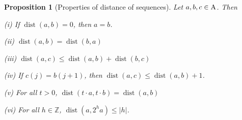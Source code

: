 \documentclass[12pt,reqno]{amsart}
\theoremstyle{plain}
\newtheorem{proposition}[theorem]{Proposition}
\numberwithin{equation}{section}
\theoremstyle{remark}
\newcommand{\uses}[1]{}
\newcommand{\usesdefs}[1]{}
\DeclareMathOperator{\dist}{dist}
\begin{document}
\begin{proposition}[Properties of distance of sequences]\label{Properties of distance of sequences}\uses{}\usesdefs{multiplicatively spaced monotone sequences,Distance of spaced sequences}
    Let $a,b,c\in {\rm A}$.
    Then

    (i) If $\dist(a,b)=0$, then $a=b$.

    (ii) $\dist(a,b)=\dist(b,a)$

    (iii) $\dist(a,c)\le \dist(a,b)+\dist(b,c)$

    (iv) If $c(j)=b(j+1)$, then $\dist(a,c)\le \dist(a,b)+1$.

    (v) For all $t>0$, $\dist(t\cdot a,t\cdot b)=\dist(a,b)$

    (vi) For all $h\in\mathbb{Z}$,
    $\dist(a,2^h a)\le |h|$.
\end{proposition}
\end{document}
